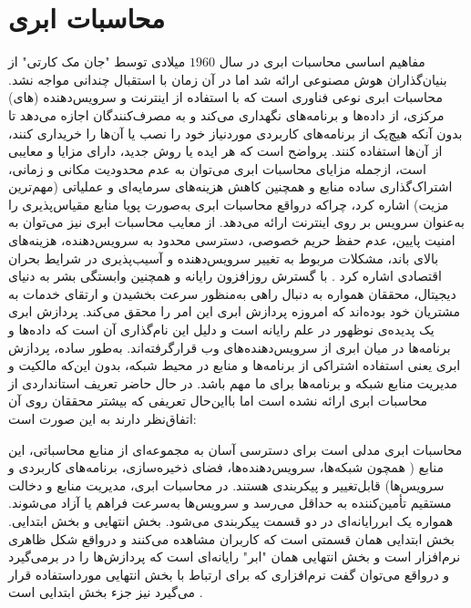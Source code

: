 \documentclass[a4paper,oneside,12pt]{report}
\begin{document}
\section{محاسبات ابری}
مفاهیم اساسی محاسبات ابری در سال 
$1960$ 
میلادی توسط "جان مک کارتی" از بنیان‌گذاران هوش مصنوعی ارائه شد اما در آن زمان با استقبال چندانی مواجه نشد. محاسبات ابری نوعی فناوری است که با استفاده از اینترنت و سرویس‌دهنده (های) مرکزی، از داده‌ها و برنامه‌های نگهداری می‌کند و به مصرف‌کنندگان اجازه می‌دهد تا بدون آنکه هیچ‌یک از برنامه‌های کاربردی موردنیاز خود را نصب یا آن‌ها را خریداری کنند، از آن‌ها استفاده کنند. پرواضح است که هر ایده یا روش جدید، دارای مزایا و معایبی است، ازجمله مزایای محاسبات ابری می‌توان به عدم محدودیت مکانی و زمانی، اشتراک‌گذاری ساده منابع و همچنین کاهش هزینه‌های سرمایه‌ای و عملیاتی (مهم‌ترین مزیت) اشاره کرد، چراکه درواقع محاسبات ابری به‌صورت پویا منابع مقیاس‌پذیری را به‌عنوان سرویس بر روی اینترنت ارائه می‌دهد. از معایب محاسبات ابری نیز می‌توان به امنیت پایین، عدم حفظ حریم خصوصی، دسترسی محدود به سرویس‌دهنده، هزینه‌های بالای باند، مشکلات مربوط به تغییر سرویس‌دهنده و آسیب‌پذیری در شرایط بحران اقتصادی اشاره کرد
\cite{3}. 
با گسترش روزافزون رایانه و همچنین وابستگی بشر به دنیای دیجیتال، محققان همواره به دنبال راهی به‌منظور سرعت بخشیدن و ارتقای خدمات به مشتریان خود بوده‌اند که امروزه پردازش ابری این امر را محقق می‌کند. پردازش ابری یک پدیده‌ی نوظهور در علم رایانه است و دلیل این نام‌گذاری آن است که داده‌ها و برنامه‌ها در میان ابری از سرویس‌دهنده‌های وب قرارگرفته‌اند. به‌طور ساده، پردازش ابری یعنی استفاده اشتراکی از برنامه‌ها و منابع در محیط شبکه، بدون این‌که مالکیت و مدیریت منابع شبکه و برنامه‌ها برای ما مهم باشد. در حال حاضر تعریف استانداردی از محاسبات ابری ارائه نشده است اما بااین‌حال تعریفی که بیشتر محققان روی آن اتفاق‌نظر دارند به این صورت است:

محاسبات ابری مدلی است برای دسترسی آسان به مجموعه‌ای از منابع محاسباتی، این منابع ( همچون شبکه‌ها، سرویس‌دهنده‌ها، فضای ذخیره‌سازی، برنامه‌های کاربردی و سرویس‌ها) قابل‌تغییر و پیکربندی هستند. در محاسبات ابری، مدیریت منابع و دخالت مستقیم تأمین‌کننده به حداقل می‌رسد و سرویس‌ها به‌سرعت فراهم یا آزاد می‌شوند. همواره یک ابررایانه‌ای در دو قسمت پیکربندی می‌شود. بخش انتهایی و بخش ابتدایی. بخش ابتدایی همان قسمتی است که کاربران مشاهده می‌کنند و درواقع شکل ظاهری نرم‌افزار است و بخش انتهایی همان "ابر" رایانه‌ای است که پردازش‌ها را در برمی‌گیرد و درواقع می‌توان گفت نرم‌افزاری که برای ارتباط با بخش انتهایی مورداستفاده قرار می‌گیرد نیز جزء بخش ابتدایی است
\cite{4}.
\end{document}
